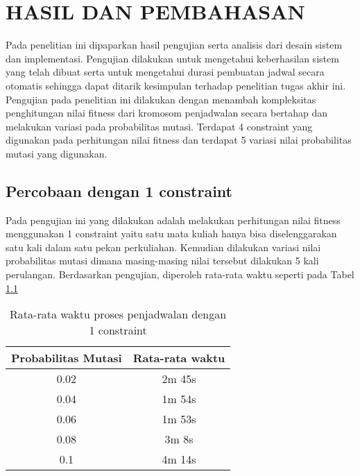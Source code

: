 \chapter{HASIL DAN PEMBAHASAN}
\label{chap:hasilpembahasan}


Pada penelitian ini dipaparkan hasil pengujian serta analisis dari desain sistem dan implementasi. 
Pengujian dilakukan untuk mengetahui keberhasilan sistem yang telah dibuat serta untuk mengetahui durasi pembuatan jadwal secara otomatis sehingga dapat ditarik kesimpulan terhadap penelitian tugas akhir ini. 
Pengujian pada penelitian ini dilakukan dengan menambah kompleksitas penghitungan nilai fitness dari kromosom penjadwalan secara bertahap dan melakukan variasi pada probabilitas mutasi.
Terdapat 4 constraint yang digunakan pada perhitungan nilai fitness dan terdapat 5 variasi nilai probabilitas mutasi yang digunakan. 

\section{Percobaan dengan 1 constraint}
\label{sec:pengujian 1}
  Pada pengujian ini yang dilakukan adalah melakukan perhitungan nilai fitness menggunakan 1 constraint yaitu satu mata kuliah hanya bisa diselenggarakan satu kali dalam satu pekan perkuliahan.
  Kemudian dilakukan variasi nilai probabilitas mutasi dimana masing-masing nilai tersebut dilakukan 5 kali perulangan. 
  Berdasarkan pengujian, diperoleh rata-rata waktu seperti pada Tabel \ref{tab:1 constraint}
  \begin{longtable}[c]{|c|c|}
    \caption{Rata-rata waktu proses penjadwalan dengan 1 constraint}
    \label{tab:1 constraint}\\
    \hline
    \rowcolor[HTML]{C0C0C0} 
    Probabilitas Mutasi & Rata-rata waktu \\ \hline
    0.02                & 2m 45s          \\ \hline
    0.04                & 1m 54s          \\ \hline
    0.06                & 1m 53s          \\ \hline
    0.08                & 3m 8s           \\ \hline
    0.1                 & 4m 14s          \\ \hline
    \end{longtable}
  
